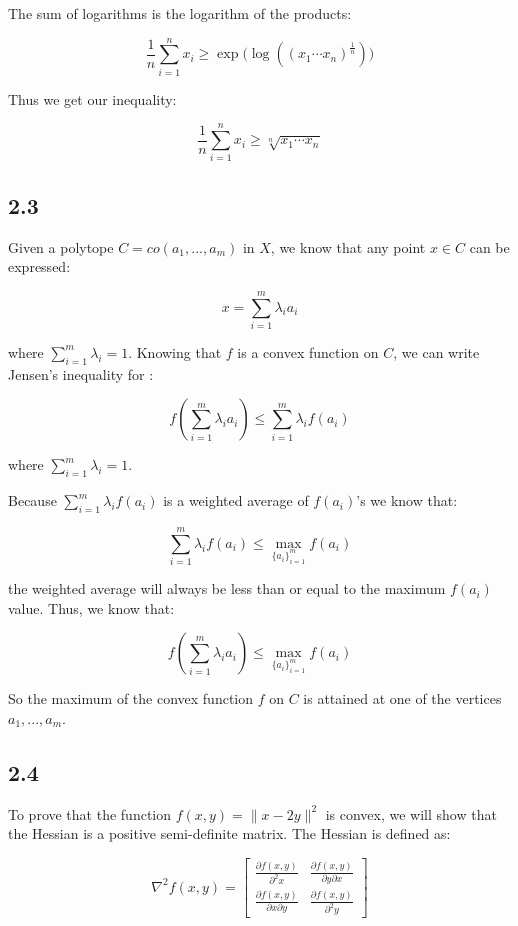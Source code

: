 \documentclass[12pt]{article}
\begin{document}
The sum of logarithms is the logarithm of the products:

\[\frac{1}{n}\sum_{i=1}^n x_i \geq \exp \bigg(\log((x_1 \cdots x_n )^{\frac{1}{n}})\bigg)\]

Thus we get our inequality:

\[\frac{1}{n}\sum_{i=1}^n x_i \geq \sqrt[n]{x_1 \cdots x_n}\] \square
\subsection*{2.3}

Given a polytope $C=co(a_1, ..., a_m)$ in $X$, we know that any point $x \in C$ can be expressed:

\[x = \sum_{i=1}^{m} \lambda_i a_i \]

where $\sum_{i=1}^{m} \lambda_i = 1$. Knowing that $f$ is a convex function on $C$, we can write Jensen's inequality for :

\[f\left(\sum_{i=1}^{m} \lambda_i a_i \right) \leq \sum_{i=1}^{m} \lambda_i f(a_i)\]

where $\sum_{i=1}^{m} \lambda_i = 1$.

Because $\sum_{i=1}^{m} \lambda_i f(a_i)$ is a weighted average of $f(a_i)$'s we know that:

\[\sum_{i=1}^{m} \lambda_i f(a_i) \leq \max_{\{a_i\}_{i=1}^m} f(a_i)\]

the weighted average will always be less than or equal to the maximum $f(a_i)$ value. Thus, we know that:

\[f\left(\sum_{i=1}^{m} \lambda_i a_i \right) \leq \max_{\{a_i\}_{i=1}^m} f(a_i)\]

So the maximum of the convex function $f$ on $C$ is attained at one of the vertices $a_1, ..., a_m$.
\square

\subsection*{2.4}

To prove that the function $f(x, y) = \| x-2y\|^2$ is convex, we will show that the Hessian is a positive semi-definite matrix. The Hessian is defined as:


\[
\nabla^2 f(x, y) = \begin{bmatrix}
                 \frac{\partial f(x, y)}{\partial^2 x} & \frac{\partial f(x, y)}{\partial y \partial x}\\
                 \frac{\partial f(x, y)}{\partial x \partial y} & \frac{\partial f(x, y)}{\partial^2 y}
         \end{bmatrix}
\]
\end{document}

